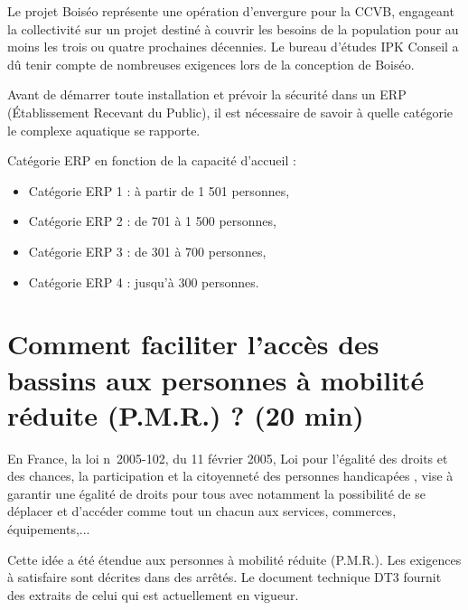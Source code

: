 Le projet Boiséo représente une opération d'envergure pour la CCVB, engageant la collectivité sur un projet destiné à couvrir les besoins de la population pour au moins les trois ou quatre prochaines décennies. Le bureau d'études IPK Conseil a dû tenir compte de nombreuses exigences lors de la conception de Boiséo.

Avant de démarrer toute installation et prévoir la sécurité dans un ERP (Établissement Recevant du Public), il est nécessaire de savoir à quelle catégorie le complexe aquatique se rapporte.

\newpage

Catégorie ERP en fonction de la capacité d'accueil :
\begin{itemize}
 \item Catégorie ERP 1 : à partir de 1 501 personnes,
 \item Catégorie ERP 2 : de 701 à 1 500 personnes,
 \item Catégorie ERP 3 : de 301 à 700 personnes,
 \item Catégorie ERP 4 : jusqu'à 300 personnes.
\end{itemize}




\section{Comment faciliter l'accès des bassins aux personnes à mobilité réduite (P.M.R.) ? (20 min)}

En France, la loi n\textdegree\ 2005-102, du 11 février 2005, \og Loi pour l'égalité des droits et des chances, la participation et la citoyenneté des personnes handicapées \fg, vise à garantir une égalité de droits pour tous avec notamment la possibilité de se déplacer et d'accéder comme
tout un chacun aux services, commerces, équipements,...

Cette idée a été étendue aux personnes à mobilité réduite (P.M.R.). Les exigences à satisfaire sont décrites dans des arrêtés. Le document technique DT3 fournit des extraits de celui qui est actuellement en vigueur.

